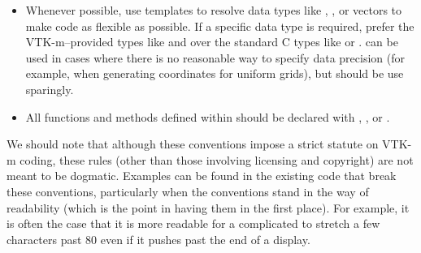 \begin{itemize}
\item Whenever possible, use templates to resolve data types like
  , , or vectors to make code as flexible
  as possible. If a specific data type is required, prefer the
  VTK-m--provided types like  and  over the
  standard C types like  or
  .  can be used in cases where there
  is no reasonable way to specify data precision (for example, when
  generating coordinates for uniform grids), but should be use sparingly.
\item All functions and methods defined within \VTKm should be
  declared with \vtkmcontexport, \vtkmexecexport, or \vtkmexeccontexport.
\end{itemize}

We should note that although these conventions impose a strict statute on
VTK-m coding, these rules (other than those involving licensing and
copyright) are not meant to be dogmatic. Examples can be found in the
existing code that break these conventions, particularly when the
conventions stand in the way of readability (which is the point in having
them in the first place). For example, it is often the case that it is more
readable for a complicated  to stretch a few characters
past 80 even if it pushes past the end of a display.
